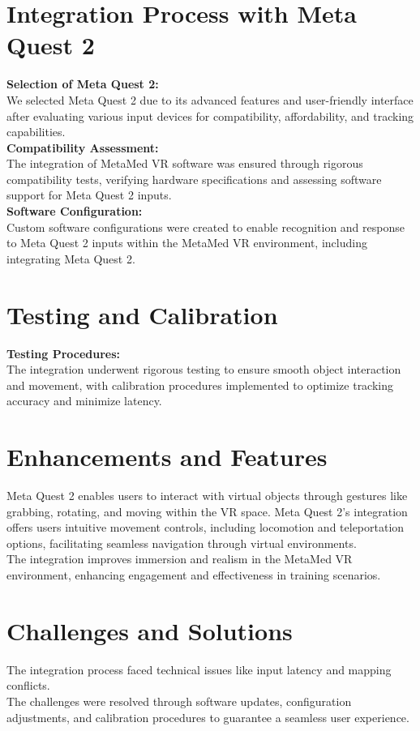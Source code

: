 \section{Integration Process with Meta Quest 2}
\textbf{Selection of Meta Quest 2:}\\
We selected Meta Quest 2 due to its advanced features and user-friendly interface after evaluating various input devices for compatibility, affordability, and tracking capabilities.\\
\textbf{Compatibility Assessment:}\\
The integration of MetaMed VR software was ensured through rigorous compatibility tests, verifying hardware specifications and assessing software support for Meta Quest 2 inputs.\\
\textbf{Software Configuration:}\\
Custom software configurations were created to enable recognition and response to Meta Quest 2 inputs within the MetaMed VR environment, including integrating Meta Quest 2.
\section{Testing and Calibration}
\textbf{Testing Procedures:}\\
The integration underwent rigorous testing to ensure smooth object interaction and movement, with calibration procedures implemented to optimize tracking accuracy and minimize latency.
\section{Enhancements and Features}
Meta Quest 2 enables users to interact with virtual objects through gestures like grabbing, rotating, and moving within the VR space. Meta Quest 2's integration offers users intuitive movement controls, including locomotion and teleportation options, facilitating seamless navigation through virtual environments.\\
The integration improves immersion and realism in the MetaMed VR environment, enhancing engagement and effectiveness in training scenarios.
\section{Challenges and Solutions}
The integration process faced technical issues like input latency and mapping conflicts.\\
The challenges were resolved through software updates, configuration adjustments, and calibration procedures to guarantee a seamless user experience.
